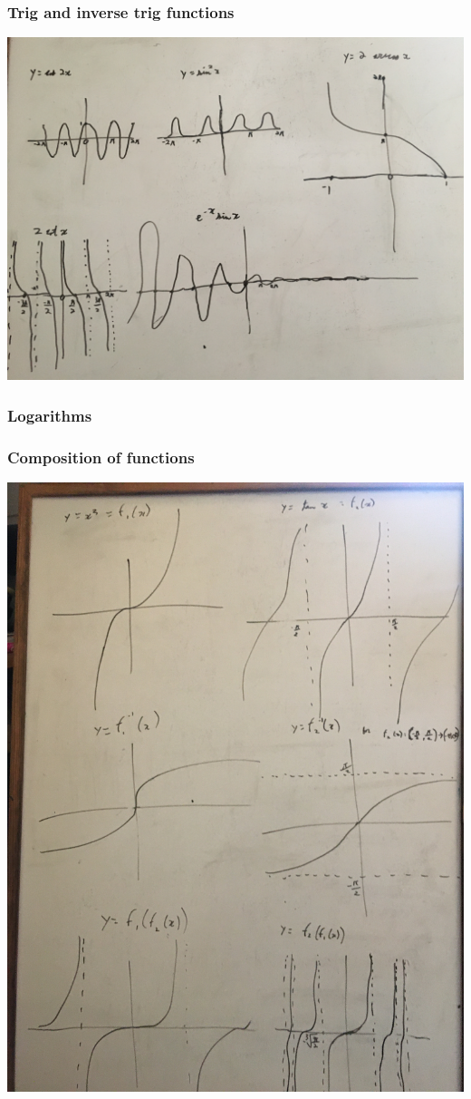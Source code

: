 \documentclass{article}
\begin{document}
\subsubsection{Trig and inverse trig functions}
\includegraphics[scale=0.1]{media/Trig_graphs}

\subsubsection{Logarithms}
	

\subsubsection{Composition of functions}
\includegraphics[scale=0.1, angle = -90]{media/Composition_graphs}
\end{document}
